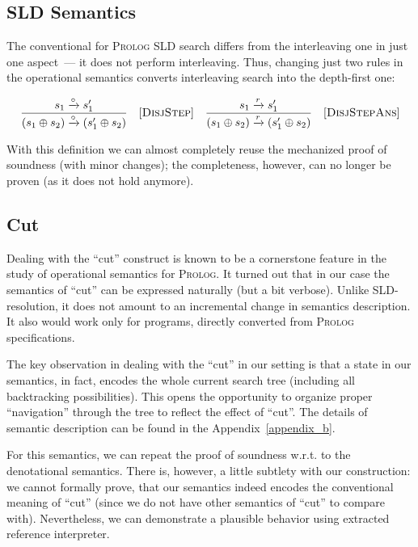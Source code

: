 \subsection{SLD Semantics}
\label{sld}

The conventional for \textsc{Prolog} SLD search differs from the interleaving one in just one aspect~--- it does not perform interleaving.
Thus, changing just two rules in the operational semantics converts interleaving search into the depth-first one:

\[
  \begin{array}{crcr}
    \dfrac{s_1 \xrightarrow{\circ} s'_1}{(s_1 \oplus s_2) \xrightarrow{\circ} (s'_1 \oplus s_2)} &\mbox{[\textsc{DisjStep}]}&
    \dfrac{s_1 \xrightarrow{r} s'_1}{(s_1 \oplus s_2) \xrightarrow{r} (s'_1 \oplus s_2)} &\mbox{[\textsc{DisjStepAns}]}
  \end{array}
\]
\vskip3mm

With this definition we can almost completely reuse the mechanized proof of soundness (with minor changes); the completeness, however,
can no longer be proven (as it does not hold anymore).

\subsection{Cut}
\label{cut}

Dealing with the ``cut'' construct is known to be a cornerstone feature in the study of operational semantics for \textsc{Prolog}. It turned out that
in our case the semantics of ``cut'' can be expressed naturally (but a bit verbose). Unlike SLD-resolution, it does not amount to an incremental
change in semantics description. It also would work only for programs, directly converted from \textsc{Prolog} specifications.

The key observation in dealing with the ``cut'' in our setting is that a state in our semantics, in fact, encodes the whole current
search tree (including all backtracking possibilities). This opens the opportunity to organize proper ``navigation'' through the tree
to reflect the effect of ``cut''. The details of semantic description can be found in the Appendix~\ref{appendix_b}.

For this semantics, we can repeat the proof of soundness w.r.t. to the denotational semantics. There is, however, a little subtlety with our construction:
we cannot formally prove, that our semantics indeed encodes the conventional meaning of ``cut'' (since we do not have other semantics of ``cut'' to compare with).
Nevertheless, we can demonstrate a plausible behavior using extracted reference interpreter.

